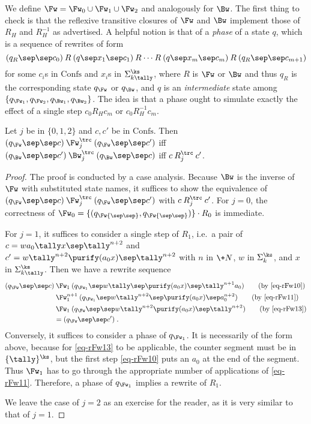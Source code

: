 We define $\Fw = \Fw_0 \cup \Fw_1 \cup \Fw_2$ and analogously for $\Bw$.
The first thing to check is that the reflexive transitive closures of
$\Fw$ and $\Bw$ implement those of $R_H$ and $R_H^{-1}$ as advertised.  A
helpful notion is that of a \emph{phase} of a state $q$, which is a
sequence of rewrites of form
\begin{equation}  
(q_R\sep\sep c_0)\mathbin{R}(q\sep x_1\sep
  c_1)\mathbin{R}\cdots\mathbin{R}(q\sep x_m\sep
  c_{m})\mathbin{R}(q_R\sep\sep c_{m+1})
\end{equation}
for some $c_i$s in $\mathrm{Confs}$ and $x_i$s in
$\Sigma_{k\tally}^\ks$, where $R$ is $\Fw$ or $\Bw$ and thus $q_R$ is
the corresponding state $q_\Fw$ or $q_\Bw$, and
$q$ is an \emph{intermediate} state among
$\{q_{\Fw_1},q_{\Fw_2},q_{\Bw_1},q_{\Bw_2}\}$.  The idea is that a
phase ought to simulate exactly the effect of a single step
$c_0\mathbin{R_H}c_m$ or $c_0\mathbin{R_H^{-1}}c_m$.
\begin{lemma}\label{lem-FwBwcor}
  Let $j$ be in $\{0,1,2\}$ and $c,c'$ be in $\mathrm{Confs}$.  Then
  $(q_\Fw\sep\sep c)\mathbin{\Fw_j^\trc}(q_\Fw\sep\sep c')$ iff $(q_\Bw\sep\sep c')\mathbin{\Bw_j^\trc}(q_\Bw\sep\sep c)$ iff $c \mathbin{R_j^\trc} c'$.
\end{lemma}
\begin{proof}
  The proof is conducted by a case analysis.  Because $\Bw$ is the
  inverse of $\Fw$ with substituted state names, it suffices to show
  the equivalence of $\mbox{$(q_\Fw\sep\sep
    c)$}\mathbin{\Fw_j^\trc}(q_\Fw\sep\sep c')$ with $c \mathbin{R_j^\trc}
  c'$. For $j=0$, the correctness of
  $\Fw_0=\{(q_\Fw{\sep\sep},q_\Fw{\sep\sep})\}\cdot R_0$ is immediate.

  For $j=1$, it suffices to consider a single step of $R_1$, i.e.\ a
  pair of $c=wa_0\tally x\sep\tally^{n+2}$ and
  $c'=w\tally^{n+2}\purify(a_0x)\sep\tally^{n+2}$ with $n$ in $\+N$, $w$ in
  $\Sigma_k^\ks$, and $x$ in $\Sigma_{k\tally}^\ks$.  Then we have a
  rewrite sequence
  \begin{align*}
    (q_\Fw\sep\sep c)
    &\mathbin{\Fw_1}(q_{\Fw_1}\sep w\tally\sep\purify(a_0x)\sep\tally^{n+1}a_0)
    \tag{by \eqref{eq-rFw10}}\\
    &\mathbin{\Fw_1^{n+1}}(q_{\Fw_1}\sep w\tally^{n+2}\sep\purify(a_0x)\sep a_0^{n+2})
    \tag{by \eqref{eq-rFw11}}\\
    &\mathbin{\Fw_1}(q_{\Fw}\sep\sep w\tally^{n+2}\purify(a_0x)\sep\tally^{n+2})
    \tag{by \eqref{eq-rFw13}}\\
    &=(q_{\Fw}\sep\sep c')\;.
  \end{align*}
  Conversely, it suffices to consider a phase of $q_{\Fw_1}$.  It
  is necessarily of the form above, because for \eqref{eq-rFw13} to be
  applicable, the counter segment must be in $\{\tally\}^\ks$, but the
  first step \eqref{eq-rFw10} puts an $a_0$ at the end of the
  segment.  Thus $\Fw_1$ has to go through the appropriate number of
  applications of \eqref{eq-rFw11}.  Therefore, a phase of
  $q_{\Fw_1}$ implies a rewrite of $R_1$.

  We leave the case of $j=2$ as an exercise for the reader, as it is
  very similar to that of $j=1$.
\end{proof}

